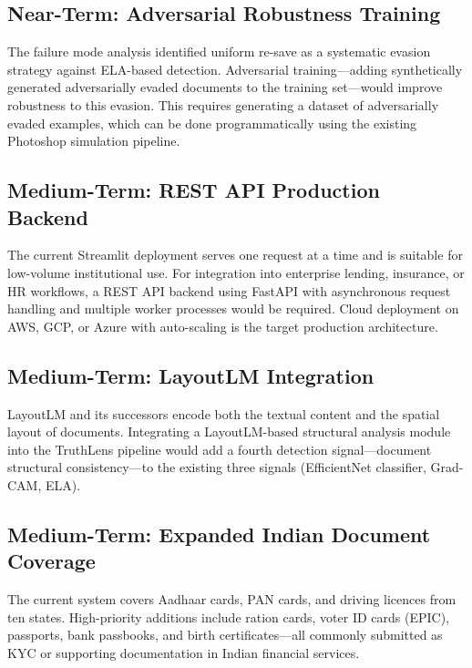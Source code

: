 \documentclass[12pt,a4paper,oneside]{report}
\begin{document}
\subsection{Near-Term: Adversarial Robustness Training}

The failure mode analysis identified uniform re-save as a systematic evasion
strategy against ELA-based detection. Adversarial training---adding synthetically
generated adversarially evaded documents to the training set---would improve
robustness to this evasion. This requires generating a dataset of adversarially
evaded examples, which can be done programmatically using the existing Photoshop
simulation pipeline.

\subsection{Medium-Term: REST API Production Backend}

The current Streamlit deployment serves one request at a time and is suitable
for low-volume institutional use. For integration into enterprise lending,
insurance, or HR workflows, a REST API backend using FastAPI with asynchronous
request handling and multiple worker processes would be required. Cloud deployment
on AWS, GCP, or Azure with auto-scaling is the target production architecture.

\subsection{Medium-Term: LayoutLM Integration}

LayoutLM \cite{xu2020} and its successors encode both the textual content and
the spatial layout of documents. Integrating a LayoutLM-based structural analysis
module into the TruthLens pipeline would add a fourth detection signal---document
structural consistency---to the existing three signals (EfficientNet classifier,
Grad-CAM, ELA).

\subsection{Medium-Term: Expanded Indian Document Coverage}

The current system covers Aadhaar cards, PAN cards, and driving licences from
ten states. High-priority additions include ration cards, voter ID cards (EPIC),
passports, bank passbooks, and birth certificates---all commonly submitted as
KYC or supporting documentation in Indian financial services.
\end{document}
